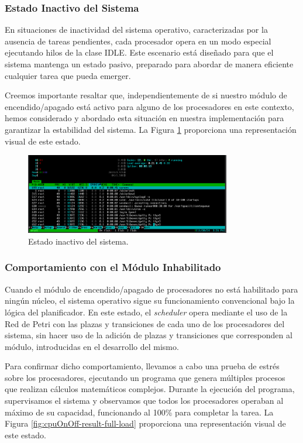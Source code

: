 \subsubsection{Estado Inactivo del Sistema}
En situaciones de inactividad del sistema operativo, caracterizadas por la ausencia de tareas pendientes, cada procesador opera en un modo especial ejecutando hilos de la clase IDLE. Este escenario está diseñado para que el sistema mantenga un estado pasivo, preparado para abordar de manera eficiente cualquier tarea que pueda emerger.\par

Creemos importante resaltar que, independientemente de si nuestro módulo de encendido/apagado está activo para alguno de los procesadores en este contexto, hemos considerado y abordado esta situación en nuestra implementación para garantizar la estabilidad del sistema. La Figura \ref{fig:cpuOnOff-result-idle} proporciona una representación visual de este estado.\par

\begin{figure}[H]
    \centering
    \includegraphics[width=0.8\textwidth]{images/cpuOnOff-result-idle.png}
    \caption{Estado inactivo del sistema.}
    \label{fig:cpuOnOff-result-idle}
\end{figure}

\subsubsection{Comportamiento con el Módulo Inhabilitado}
Cuando el módulo de encendido/apagado de procesadores no está habilitado para ningún núcleo, el sistema operativo sigue su funcionamiento convencional bajo la lógica del planificador. En este estado, el \textit{scheduler} opera mediante el uso de la Red de Petri  con las plazas y transiciones de cada uno de los procesadores del sistema, sin hacer uso de la adición de plazas y transiciones que corresponden al módulo, introducidas en el desarrollo del mismo.\par

Para confirmar dicho comportamiento, llevamos a cabo una prueba de estrés sobre los procesadores, ejecutando un programa que genera múltiples procesos que realizan cálculos matemáticos complejos. Durante la ejecución del programa, supervisamos el sistema y observamos que todos los procesadores operaban al máximo de su capacidad, funcionando al 100\% para completar la tarea. La Figura \ref{fig:cpuOnOff-result-full-load} proporciona una representación visual de este estado.\par

